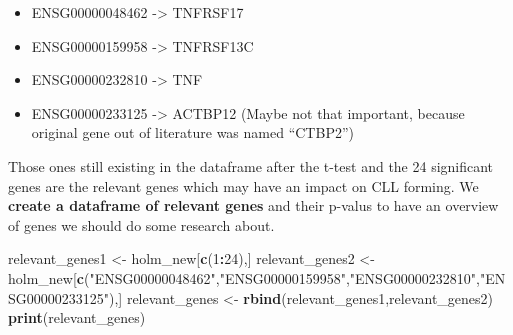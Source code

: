 \documentclass[]{article}
\newenvironment{Shaded}{\begin{snugshade}}{\end{snugshade}}
\newcommand{\KeywordTok}[1]{\textcolor[rgb]{0.13,0.29,0.53}{\textbf{#1}}}
\newcommand{\DecValTok}[1]{\textcolor[rgb]{0.00,0.00,0.81}{#1}}
\newcommand{\StringTok}[1]{\textcolor[rgb]{0.31,0.60,0.02}{#1}}
\newcommand{\OperatorTok}[1]{\textcolor[rgb]{0.81,0.36,0.00}{\textbf{#1}}}
\newcommand{\NormalTok}[1]{#1}
\providecommand{\tightlist}{%
  \setlength{\itemsep}{0pt}\setlength{\parskip}{0pt}}
\begin{document}
\begin{itemize}
\tightlist
\item
  ENSG00000048462 -\textgreater{} TNFRSF17
\item
  ENSG00000159958 -\textgreater{} TNFRSF13C
\item
  ENSG00000232810 -\textgreater{} TNF
\item
  ENSG00000233125 -\textgreater{} ACTBP12 (Maybe not that important,
  because original gene out of literature was named ``CTBP2'')
\end{itemize}

Those ones still existing in the dataframe after the t-test and the 24
significant genes are the relevant genes which may have an impact on CLL
forming. We \textbf{create a dataframe of relevant genes} and their
p-valus to have an overview of genes we should do some research about.

\begin{Shaded}
\begin{Highlighting}[]
\NormalTok{relevant_genes1 <-}\StringTok{ }\NormalTok{holm_new[}\KeywordTok{c}\NormalTok{(}\DecValTok{1}\OperatorTok{:}\DecValTok{24}\NormalTok{),]}
\NormalTok{relevant_genes2 <-}\StringTok{ }\NormalTok{holm_new[}\KeywordTok{c}\NormalTok{(}\StringTok{"ENSG00000048462"}\NormalTok{,}\StringTok{"ENSG00000159958"}\NormalTok{,}\StringTok{"ENSG00000232810"}\NormalTok{,}\StringTok{"ENSG00000233125"}\NormalTok{),]}
\NormalTok{relevant_genes <-}\StringTok{ }\KeywordTok{rbind}\NormalTok{(relevant_genes1,relevant_genes2)}
\KeywordTok{print}\NormalTok{(relevant_genes)}
\end{Highlighting}
\end{Shaded}
\end{document}
